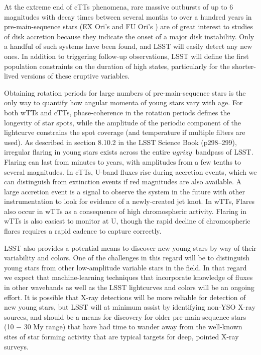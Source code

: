 At the extreme end of cTTs phenomena, rare massive
outbursts of up to 6 magnitudes with decay times between several months
to over a hundred years in pre-main-sequence stars (EX Ori's \citep{herbig01}
and FU Ori's \citep{hartmann96})
are of great interest to studies of disk accretion because they indicate the onset of
a major disk instability. Only a handful of such systems have been found, and LSST
will easily detect any new ones.  In addition to triggering
follow-up observations, LSST will define the first population
constraints on the duration of high states, particularly for the shorter-lived
versions of these eruptive variables.  

Obtaining rotation periods for large numbers of pre-main-sequence stars is the only way to
quantify how angular momenta of young stars vary with age. For both wTTs and cTTs,
phase-coherence in the rotation periods defines the longevity of star spots, while the
amplitude of the periodic component of the lightcurve constrains the spot coverage (and
temperature if multiple filters are used).  As described in section 8.10.2 in the
LSST Science Book (p298--299), irregular flaring in young stars exists across the entire
$ugrizy$~bandpass of LSST. Flaring can last from minutes to years, with
amplitudes from a few tenths to several magnitudes.  In cTTs, U-band fluxes rise during
accretion events, which we can distinguish from extinction events if red magnitudes are
also available. A large accretion event is a signal to observe the system
in the future with other instrumentation to look for evidence of a newly-created
jet knot. In wTTs, Flares also occur in wTTs as a consequence of high chromospheric activity.
Flaring in wTTs is also easiest to monitor at U, though the rapid decline of
chromospheric flares requires a rapid cadence to capture correctly.

LSST also provides a potential means to discover new young stars by way of
their variability and colors. One of the challenges in this regard will be to
distinguish young stars from other low-amplitude variable stars in the field.
In that regard we expect that machine-learning techniques that incorporate knowledge of
fluxes in other wavebands as well as the LSST lightcurves and colors will
be an ongoing effort. It is possible that X-ray detections will be more
reliable for detection of new young stars, but LSST will at minimum assist
by identifying non-YSO X-ray sources, and should be a means for discovery
for older pre-main-sequence stars (10 $-$ 30 My range) that have had time
to wander away from the well-known sites of star forming activity that are
typical targets for deep, pointed X-ray surveys.

